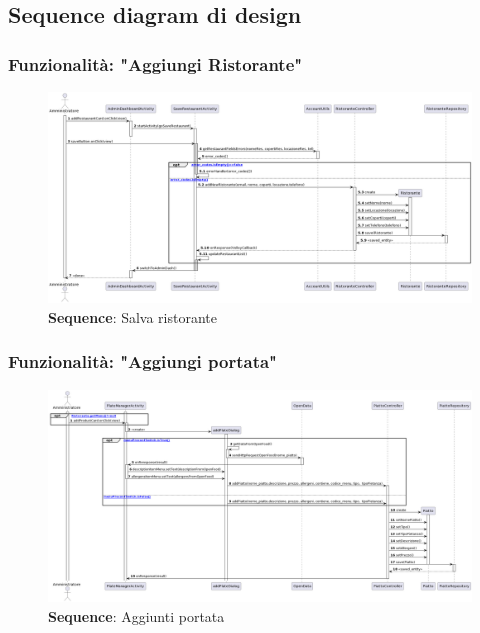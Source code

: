 \subsection{Sequence diagram di design}

\subsubsection{Funzionalità: "Aggiungi Ristorante"}
\begin{flushleft}


\end{flushleft}


\begin{figure}[H]
    \centering
    \includegraphics[scale=0.3]{assets/diagrammi/Sequence di design/Salva Ristorante.png}
    \caption{\textbf{Sequence}: Salva ristorante}\label{fig:seq_save_rest}
\end{figure}

\subsubsection{Funzionalità: "Aggiungi portata"}

\begin{figure}[H]
    \centering
    \includegraphics[scale=0.3]{assets/diagrammi/Sequence di design/Aggiungi Piatto.png}
    \caption{\textbf{Sequence}: Aggiunti portata}\label{fig:seq_save_plate}
\end{figure}
\newpage

